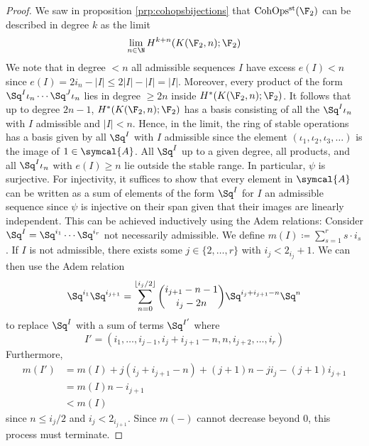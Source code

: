 \begin{proof}
	We saw in proposition \ref{prp:cohopsbijections} that $\CohOpsst(\F_2)$ can be described in degree $k$ as the limit 
	\begin{equation*}
		\lim_{n \in \N} H^{k + n}(K(\F_2, n); \F_2)
	\end{equation*}
	We note that in degree $< n$ all admissible sequences $I$ have excess $e(I) < n$ since $e(I) = 2 i_n - |I| \leq 2 |I| - |I| = |I|$.
	Moreover, every product of the form $\Sq^I \iota_n \cdots \Sq^J \iota_n$ lies in degree $\geq 2n$ inside $H^*(K(\F_2, n); \F_2)$.
	It follows that up to degree $2n - 1$, $H^*(K(\F_2, n); \F_2)$ has a basis consisting of all the $\Sq^I \iota_n$ with $I$ admissible and $|I| < n$.
	Hence, in the limit, the ring of stable operations has a basis given by all $\Sq^I$ with $I$ admissible since the element $(\iota_1, \iota_2, \iota_3, \ldots)$ is the image of $1 \in \symcal{A}$.
	All $\Sq^I$ up to a given degree, all products, and all $\Sq^I \iota_n$ with $e(I) \geq n$ lie outside the stable range.
	In particular, $\psi$ is surjective.
	For injectivity, it suffices to show that every element in $\symcal{A}$ can be written as a sum of elements of the form $\Sq^I$ for $I$ an admissible sequence since $\psi$ is injective on their span given that their images are linearly independent.
	This can be achieved inductively using the Adem relations:
	Consider $\Sq^I = \Sq^{i_1} \cdots \Sq^{i_r}$ not necessarily admissible.
	We define $m(I) \coloneq \sum_{s = 1}^r s \cdot i_s$.
	If $I$ is not admissible, there exists some $j \in \{2, \ldots, r\}$ with $i_j < 2_{i_j} + 1$.
	We can then use the Adem relation
	\begin{equation*}
		\Sq^{i_1}\Sq^{i_{j + 1}} = \sum_{n = 0}^{\lfloor i_j / 2\rfloor} \binom{i_{j + 1} - n - 1}{i_j - 2n} \Sq^{i_j + i_{j + 1} - n}\Sq^n
	\end{equation*}
	to replace $\Sq^I$ with a sum of terms $\Sq^{I'}$ where
	\begin{equation*}
		I' = (i_1, \ldots, i_{j - 1}, i_j + i_{j + 1} - n, n, i_{j + 2}, \ldots, i_r)
	\end{equation*}
	Furthermore, 
	\begin{align*}
		m(I') &= m(I) + j (i_j + i_{j + 1} - n) + (j + 1) n - j i_j - (j + 1) i_{j + 1} \\
			  &= m(I) n - i_{j + 1} \\
			  &< m(I)
	\end{align*}
	since $n \leq i_j / 2$ and $i_j < 2_{i_{j + 1}}$.
	Since $m({{-}})$ cannot decrease beyond 0, this process must terminate.
\end{proof}
